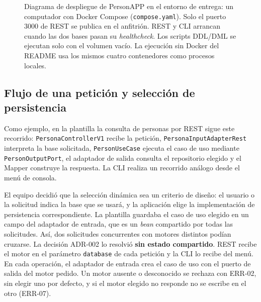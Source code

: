 \documentclass[11pt,a4paper]{article}
\begin{document}
\begin{figure}[H]
\cuatroLeyenda{\leyPersona\quad\leyNodo\quad\leyContenedor\quad\leyBase\quad\leyRelacion}
\caption{Diagrama de despliegue de PersonAPP en el entorno de entrega: un computador con Docker
Compose (\texttt{compose.yaml}). Solo el puerto 3000 de REST se publica en el anfitrión. REST y CLI
arrancan cuando las dos bases pasan su \emph{healthcheck}. Los scripts DDL/DML se ejecutan solo
con el volumen vacío. La ejecución sin Docker del README usa los mismos cuatro contenedores
como procesos locales.}
\label{fig:c4-despliegue}
\end{figure}

\subsection{Flujo de una petición y selección de persistencia}
Como ejemplo, en la plantilla la consulta de personas por REST sigue este
recorrido: \texttt{PersonaController\allowbreak V1} recibe la petición,
\texttt{PersonaInputAdapter\allowbreak Rest} interpreta la base solicitada,
\texttt{PersonUseCase} ejecuta el caso de uso mediante
\texttt{PersonOutputPort}, el adaptador de salida consulta el repositorio
elegido y el Mapper construye la respuesta. La CLI realiza un recorrido
análogo desde el menú de consola.

El equipo decidió que la selección dinámica sea un criterio de diseño: el usuario
o la solicitud indica la base que se usará, y la aplicación elige la implementación
de persistencia correspondiente. La plantilla guardaba el caso de uso elegido en
un campo del adaptador de entrada, que es un \emph{bean} compartido por todas las
solicitudes. Así, dos solicitudes concurrentes con motores distintos podían
cruzarse. La decisión ADR-002 lo resolvió \textbf{sin estado compartido}. REST
recibe el motor en el parámetro \texttt{database} de cada petición y la CLI lo
recibe del menú. En cada operación, el adaptador de entrada crea el caso de uso
con el puerto de salida del motor pedido. Un motor ausente o desconocido se
rechaza con ERR-02, sin elegir uno por defecto, y si el motor elegido no
responde no se escribe en el otro (ERR-07).
\end{document}
